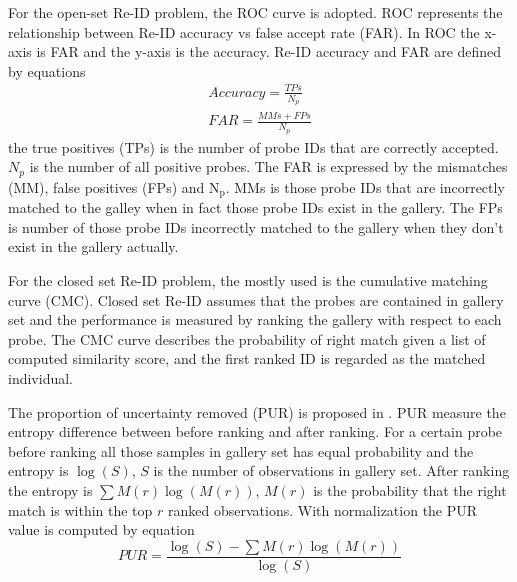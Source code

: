For the open-set Re-ID problem, the ROC \cite{PartbasedSTReid, MultiPersonREID} curve is adopted. ROC represents the relationship between Re-ID accuracy vs false accept rate (FAR). In ROC the x-axis is FAR and the y-axis is the accuracy. Re-ID accuracy and FAR are defined by equations
\begin{equation}
\begin{aligned}
Accuracy = \frac{TPs}{N_p}\\
FAR = \frac{MMs + FPs}{N_p}
\end{aligned}
\end{equation}
the true positives (TPs) is the number of probe IDs that are correctly accepted. $N_p$ is the number of all positive probes. The FAR is expressed by the mismatches (MM), false positives (FPs) and N$_\text{p}$. MMs is those probe IDs that are incorrectly matched to the galley when in fact those probe IDs exist in the gallery. The FPs is number of those probe IDs incorrectly matched to the gallery when they don't exist in the gallery actually. 

For the closed set Re-ID problem, the mostly used is the cumulative matching curve (CMC). Closed set Re-ID assumes that the probes are contained in gallery set and the performance is measured by ranking the gallery with respect to each probe. The CMC curve describes the probability of right match given a list of computed similarity score, and the first ranked ID is regarded as the matched individual.

The proportion of uncertainty removed (PUR) is proposed in \cite{LFDA}. PUR measure the entropy difference between before ranking and after ranking. For a certain probe before ranking all those samples in gallery set has equal probability and the entropy is $\log(S)$, $S$ is the number of observations in gallery set. After ranking the entropy is $\sum M(r)\log(M(r))$, $M(r)$ is the probability that the right match is within the top $r$ ranked observations. With normalization the PUR value is computed by equation
\begin{equation}
PUR = \frac{\log(S)-\sum M(r)\log(M(r))}{\log(S)}
\end{equation}

